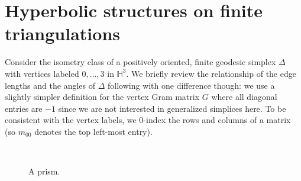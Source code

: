 \documentclass[utopia,fullpage]{nmd/article}
\renewcommand\H{\mathbb H}
\begin{document}
\section{Hyperbolic structures on finite triangulations} \label{sec:hypStru}

Consider the isometry class of a positively oriented, finite geodesic simplex $\Delta$ with vertices labeled $0, \dots, 3$ in $\H^3$. We briefly review the relationship of the edge lengths and the angles of $\Delta$ following \cite{heardThesis} with one difference though: we use a slightly simpler definition for the vertex Gram matrix $G$ where all diagonal entries are $-1$ since we are not interested in generalized simplices here. To be consistent with the vertex labels, we $0$-index the rows and columns of a matrix (so $m_{00}$ denotes the top left-most entry). 

\begin{figure}[htb]
\begin{minipage}{\textwidth}
\begin{center}
\begin{minipage}{0.32\textwidth}
\begin{center}
\scalebox{1.0}{

}
\end{center}
\end{minipage}
\begin{minipage}{0.32\textwidth}
\begin{center}
\scalebox{0.9}{
}
\end{center}
\end{minipage}
\begin{minipage}{0.32\textwidth}
\begin{center}
\scalebox{0.9}{
}
\end{center}
\end{minipage}\\ %
\begin{minipage}[t]{0.36\textwidth}
\caption{Angles of simplex.} \label{fig:anglesInTet}
\end{minipage}
\begin{minipage}[t]{0.35\textwidth}
\caption{A doubly truncated simplex $\overline{\Delta}$, also known as permutahedron.}\label{fig:DoublyTruncated} \end{minipage}
\begin{minipage}[t]{0.26\textwidth}
\caption{A prism.}\label{fig:Prism}
\end{minipage}
\end{center}
\end{minipage}
\end{figure}
\end{document}
